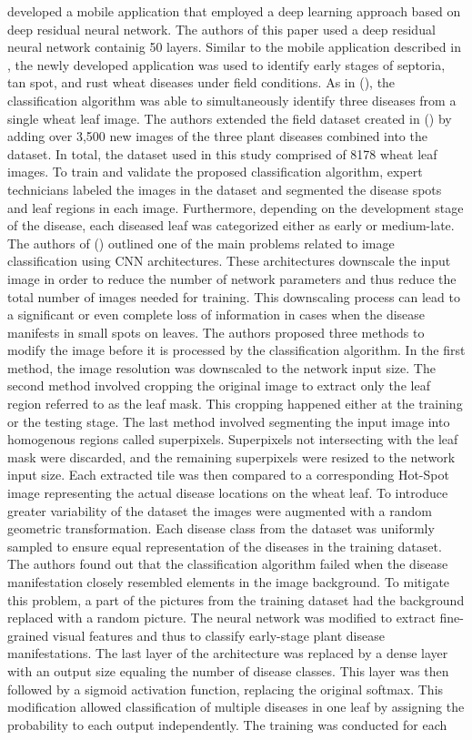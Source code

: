 \documentclass{BachelorBUI}
\begin{document}
\textcite{Picon:2019} developed a mobile application that employed a deep learning approach based on deep residual neural network. The authors of this paper used a deep residual neural network containig 50 layers. Similar to the mobile application described in \textcite{Johannes:2017}, the newly developed application was used to identify early stages of septoria, tan spot, and rust wheat diseases under field conditions. As in (\cite{Johannes:2017}), the classification algorithm was able to simultaneously identify three diseases from a single wheat leaf image. The authors extended the field dataset created in (\cite{Johannes:2017}) by adding over 3,500 new images of the three plant diseases combined into the dataset. In total, the dataset used in this study comprised of 8178 wheat leaf images. To train and validate the proposed classification algorithm, expert technicians labeled the images in the dataset and segmented the disease spots and leaf regions in each image. Furthermore, depending on the development stage of the disease, each diseased leaf was categorized either as early or medium-late. The authors of (\cite{Picon:2019}) outlined one of the main problems related to image classification using CNN architectures. These architectures downscale the input image in order to reduce the number of network parameters and thus reduce the total number of images needed for training. This downscaling process can lead to a significant or even complete loss of information in cases when the disease manifests in small spots on leaves. The authors proposed three methods to modify the image before it is processed by the classification algorithm. In the first method, the image resolution was downscaled to the network input size. The second method involved cropping the original image to extract only the leaf region referred to as the leaf mask. This cropping happened either at the training or the testing stage. The last method involved segmenting the input image into homogenous regions called superpixels. Superpixels not intersecting with the leaf mask were discarded, and the remaining superpixels were resized to the network input size. Each extracted tile was then compared to a corresponding Hot-Spot image representing the actual disease locations on the wheat leaf. To introduce greater variability of the dataset the images were augmented with a random geometric transformation. Each disease class from the dataset was uniformly sampled to ensure equal representation of the diseases in the training dataset. The authors found out that the classification algorithm failed when the disease manifestation closely resembled elements in the image background. To mitigate this problem, a part of the pictures from the training dataset had the background replaced with a random picture. The neural network was modified to extract fine-grained visual features and thus to classify early-stage plant disease manifestations. The last layer of the architecture was replaced by a dense layer with an output size equaling the number of disease classes. This layer was then followed by a sigmoid activation function, replacing the original softmax. This modification allowed classification of multiple diseases in one leaf by assigning the probability to each output independently. The training was conducted for each 
\end{document}
